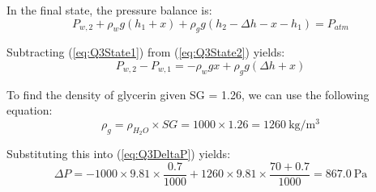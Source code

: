 In the final state, the pressure balance is:
\begin{equation}
    P_{w, 2} + \rho_{w} g (h_1 + x) + \rho_{g} g (h_2 - \Delta h - x - h_1) = P_{atm} \label{eq:Q3State2}
\end{equation}

Subtracting (\ref{eq:Q3State1}) from (\ref{eq:Q3State2}) yields:
\begin{equation}
    P_{w, 2} - P_{w, 1} = -\rho_{w} g x + \rho_{g} g (\Delta h + x) \label{eq:Q3DeltaP}
\end{equation}

To find the density of glycerin given SG = 1.26, we can use the following equation:
\begin{equation}
    \rho_{g} = \rho_{H_2O} \times SG = 1000 \times 1.26 = \qty{1260}{\kilogram\per\meter\cubed} \nonumber
\end{equation}

Substituting this into (\ref{eq:Q3DeltaP}) yields:
\begin{equation}
    \Delta P = -1000 \times 9.81 \times \frac{0.7}{1000} + 1260 \times 9.81 \times \frac{70 + 0.7}{1000} = \boxed{\qty{867.0}{\pascal}} \nonumber
\end{equation}